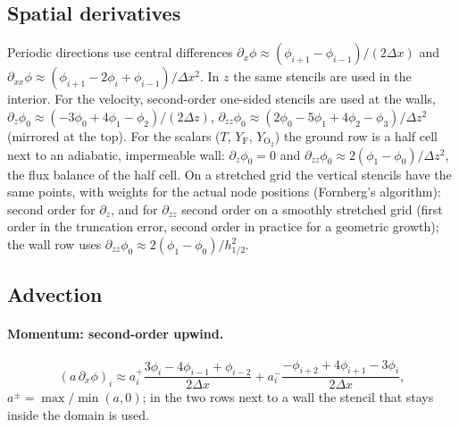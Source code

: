 \documentclass[11pt,a4paper]{article}
\newcommand{\Yf}{Y_\text{F}}
\newcommand{\YO}{Y_{\mathrm{O_2}}}
\begin{document}
\subsection{Spatial derivatives}\label{sec:derivatives}
Periodic directions use central differences
$\partial_x\phi\approx(\phi_{i+1}-\phi_{i-1})/(2\Delta x)$ and
$\partial_{xx}\phi\approx(\phi_{i+1}-2\phi_i+\phi_{i-1})/\Delta x^2$.
In $z$ the same stencils are used in the interior. For the velocity, second-order one-sided stencils
are used at the walls, $\partial_z\phi_0\approx(-3\phi_0+4\phi_1-\phi_2)/(2\Delta z)$,
$\partial_{zz}\phi_0\approx(2\phi_0-5\phi_1+4\phi_2-\phi_3)/\Delta z^2$ (mirrored at the top). For
the scalars ($T$, $\Yf$, $\YO$) the ground row is a half cell next to an adiabatic, impermeable wall:
$\partial_z\phi_0=0$ and $\partial_{zz}\phi_0\approx2(\phi_1-\phi_0)/\Delta z^2$, the flux balance of
the half cell. On a stretched grid the vertical stencils have the same points, with weights for the actual
node positions (Fornberg's algorithm): second order for $\partial_z$, and for $\partial_{zz}$ second order
on a smoothly stretched grid (first order in the truncation error, second order in practice for a
geometric growth); the wall row uses $\partial_{zz}\phi_0\approx2(\phi_1-\phi_0)/h_{1/2}^2$.

\subsection{Advection}\label{sec:advection}
\paragraph{Momentum: second-order upwind.}
\begin{equation}
  (a\,\partial_x\phi)_i \approx a_i^+\frac{3\phi_i-4\phi_{i-1}+\phi_{i-2}}{2\Delta x}
  + a_i^-\frac{-\phi_{i+2}+4\phi_{i+1}-3\phi_i}{2\Delta x},
\end{equation}
$a^\pm=\max/\min(a,0)$; in the two rows next to a wall the stencil that stays inside the domain is
used.
\end{document}
